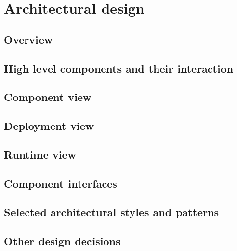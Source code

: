 \chapter{Architectural design} \label{chap:architectural}


\section{Overview}
\lipsum[1]


\section{High level components and their interaction}
\lipsum[2]


\section{Component view}
\lipsum[3]


\section{Deployment view}
\lipsum[4]


\section{Runtime view}
\lipsum[5]


\section{Component interfaces}
\lipsum[6]


\section{Selected architectural styles and patterns}
\lipsum[7]


\section{Other design decisions}
\lipsum[8]
